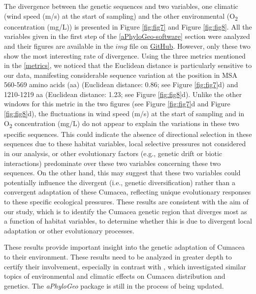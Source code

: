 {The divergence between the genetic sequences and two variables, one climatic (wind speed (m/s) at the start of sampling) and the other environmental (O\textsubscript{2} concentration (mg/L)) is presented in Figure \ref{fig:fig7} and Figure \ref{fig:fig8}. All the variables given in the first step of the \autoref{aPhyloGeo-software} section were analyzed and their figures are available in the $img$ file on \href{https://github.com/tahiri-lab/Cumacea_aPhyloGeo}{GitHub}. However, only these two show the most interesting rate of divergence. Using the three metrics mentioned in the \autoref{metrics}, we noticed that the Euclidean distance is particularly sensitive to our data, manifesting considerable sequence variation at the position in MSA 560-569 amino acids (aa) (Euclidean distance: 0.86; see Figure \ref{fig:fig7}d) and 1210-1219 aa (Euclidean distance: 1.23; see Figure \ref{fig:fig8}d). Unlike the other windows for this metric in the two figures (see Figure \ref{fig:fig7}d and Figure \ref{fig:fig8}d), the fluctuations in wind speed (m/s) at the start of sampling and in O\textsubscript{2} concentration (mg/L) do not appear to explain the variations in these two specific sequences. This could indicate the absence of directional selection in these sequences due to these habitat variables, local selective pressures not considered in our analysis, or other evolutionary factors (e.g., genetic drift or biotic interactions) predominate over these two variables concerning these two sequences. On the other hand, this may suggest that these two variables could potentially influence the divergent (i.e., genetic diversification) rather than a convergent adaptation of these Cumacea, reflecting unique evolutionary responses to these specific ecological pressures. These results are consistent with the aim of our study, which is to identify the Cumacea genetic region that diverges most as a function of habitat variables, to determine whether this is due to divergent local adaptation or other evolutionary processes.

These results provide important insight into the genetic adaptation of Cumacea to their environment. These results need to be analyzed in greater depth to certify their involvement, especially in contrast with \citep{uhlir_adding_2021}, which investigated similar topics of environmental and climatic effects on Cumacea distribution and genetics. The \textit{aPhyloGeo} package is still in the process of being updated.

}
